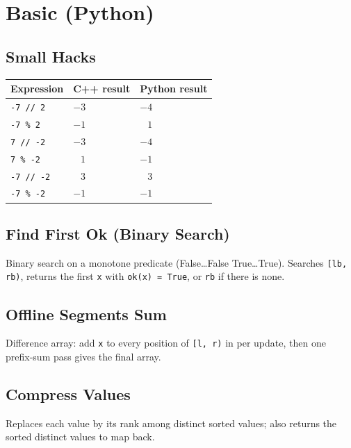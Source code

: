 \section{Basic (Python)}

\subsection{Small Hacks}

\begin{center}
\begin{tabular}{lll}
\hline
Expression & C++ result & Python result \\
\hline
\texttt{-7 // 2}  & $     -3$ & $     -4$ \\
\texttt{-7 \% 2}  & $     -1$ & $\;\;\:1$  \\
\texttt{7 // -2}  & $     -3$ & $     -4$ \\
\texttt{7 \% -2}  & $\;\;\:1$ & $     -1$ \\
\texttt{-7 // -2} & $\;\;\:3$ & $\;\;\:3$  \\
\texttt{-7 \% -2} & $     -1$ & $     -1$ \\
\hline
\end{tabular}
\end{center}


\subsection{Find First Ok (Binary Search)}
Binary search on a monotone predicate (False\dots False True\dots True). Searches \verb|[lb, rb)|, returns the first \verb|x| with \verb|ok(x) = True|, or \verb|rb| if there is none.

\subsection{Offline Segments Sum}
Difference array: add \verb|x| to every position of \verb|[l, r)| in per update, then one prefix-sum pass gives the final array. 

\subsection{Compress Values}
Replaces each value by its rank among distinct sorted values; also returns the sorted distinct values to map back. 

